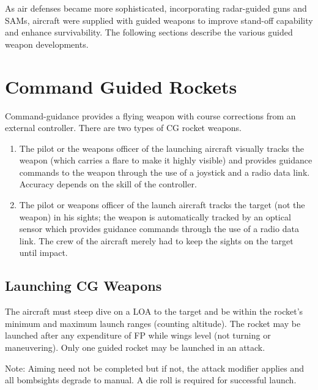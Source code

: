 

As air defenses became more sophisticated, incorporating radar-guided guns and SAMs, aircraft were supplied with guided weapons to improve stand-off capability and enhance survivability. The following sections describe the various guided weapon developments.

\section{Command Guided Rockets}

Command-guidance provides a flying weapon with course corrections from an external controller. There are two types of CG rocket weapons.

\begin{enumerate}

\item[1)] The pilot or the weapons officer of the launching aircraft visually tracks the weapon (which carries a flare to make it highly visible) and provides guidance commands to the weapon through the use of a joystick and a radio data link. Accuracy depends on the skill of the controller.

\item[2)] The pilot or weapons officer of the launch aircraft tracks the target (not the weapon) in his sights; the weapon is automatically tracked by an optical sensor which provides guidance commands through the use of a radio data link. The crew of the aircraft merely had to keep the sights on the target until impact.

\end{enumerate}

\subsection{Launching CG Weapons} The aircraft must steep dive on a LOA to the target and be within the rocket's minimum and maximum launch ranges (counting altitude). The rocket may be launched after any expenditure of FP while wings level (not turning or maneuvering). Only one guided rocket may be launched in an attack.

Note: Aiming need not be completed but if not, the  attack modifier applies and all bombsights degrade to manual. A die roll is required for successful launch.

